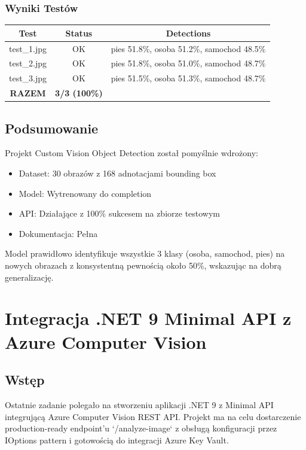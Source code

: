 \documentclass[twoside]{article}
\begin{document}
\subsubsection{Wyniki Testów}

\begin{center}
	\begin{tabular}{|c|c|c|}
		\hline
		\textbf{Test} & \textbf{Status} & \textbf{Detections} \\
		\hline
		test\_1.jpg & OK & pies 51.8\%, osoba 51.2\%, samochod 48.5\% \\
		test\_2.jpg & OK & pies 51.8\%, osoba 51.0\%, samochod 48.7\% \\
		test\_3.jpg & OK & pies 51.5\%, osoba 51.3\%, samochod 48.7\% \\
		\hline
		\textbf{RAZEM} & \textbf{3/3 (100\%)} & \\
		\hline
	\end{tabular}
\end{center}


\subsection{Podsumowanie}

Projekt Custom Vision Object Detection został pomyślnie wdrożony:

\begin{itemize}
	\item Dataset: 30 obrazów z 168 adnotacjami bounding box
	\item Model: Wytrenowany do completion
	\item API: Działające z 100\% sukcesem na zbiorze testowym
	\item Dokumentacja: Pełna
\end{itemize}

Model prawidłowo identyfikuje wszystkie 3 klasy (osoba, samochod, pies) na nowych obrazach z konsystentną pewnością około 50\%, wskazując na dobrą generalizację.

\newpage
\section{Integracja .NET 9 Minimal API z Azure Computer Vision}

\subsection{Wstęp}

Ostatnie zadanie polegało na stworzeniu aplikacji .NET 9 z Minimal API integrującą Azure Computer Vision REST API. Projekt ma na celu dostarczenie production-ready endpoint'u `/analyze-image` z obsługą konfiguracji przez IOptions pattern i gotowością do integracji Azure Key Vault.
\end{document}
